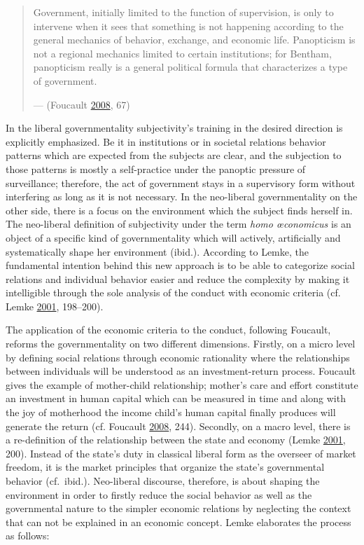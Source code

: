 \documentclass[12pt,twoside]{report}
\begin{document}
\begin{quote}
Government, initially limited to the function of supervision, is only to intervene when it sees that something is not happening according to the general mechanics of behavior, exchange, and economic life. Panopticism is not a regional mechanics limited to certain institutions; for Bentham, panopticism really is a general political formula that characterizes a type of government.

--- (Foucault \protect\hyperlink{ref-Foucault2008}{2008}, 67)
\end{quote}

In the liberal governmentality subjectivity's training in the desired direction is explicitly emphasized. Be it in institutions or in societal relations behavior patterns which are expected from the subjects are clear, and the subjection to those patterns is mostly a self-practice under the panoptic pressure of surveillance; therefore, the act of government stays in a supervisory form without interfering as long as it is not necessary. In the neo-liberal governmentality on the other side, there is a focus on the environment which the subject finds herself in. The neo-liberal definition of subjectivity under the term \emph{homo œconomicus} is an object of a specific kind of governmentality which will actively, artificially and systematically shape her environment (ibid.). According to Lemke, the fundamental intention behind this new approach is to be able to categorize social relations and individual behavior easier and reduce the complexity by making it intelligible through the sole analysis of the conduct with economic criteria (cf. Lemke \protect\hyperlink{ref-Lemke2001}{2001}, 198--200).

The application of the economic criteria to the conduct, following Foucault, reforms the governmentality on two different dimensions. Firstly, on a micro level by defining social relations through economic rationality where the relationships between individuals will be understood as an investment-return process. Foucault gives the example of mother-child relationship; mother's care and effort constitute an investment in human capital which can be measured in time and along with the joy of motherhood the income child's human capital finally produces will generate the return (cf. Foucault \protect\hyperlink{ref-Foucault2008}{2008}, 244). Secondly, on a macro level, there is a re-definition of the relationship between the state and economy (Lemke \protect\hyperlink{ref-Lemke2001}{2001}, 200). Instead of the state's duty in classical liberal form as the overseer of market freedom, it is the market principles that organize the state's governmental behavior (cf.~ibid.). Neo-liberal discourse, therefore, is about shaping the environment in order to firstly reduce the social behavior as well as the governmental nature to the simpler economic relations by neglecting the context that can not be explained in an economic concept. Lemke elaborates the process as follows:
\end{document}
